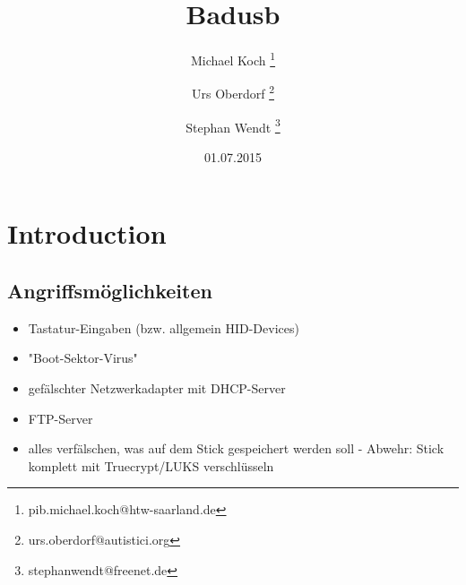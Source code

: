 \documentclass[
a4paper, %
twoside%
]{article}
\title{Badusb}
\author{Michael Koch
\thanks{pib.michael.koch@htw-saarland.de}
\and{Urs Oberdorf}
\thanks{urs.oberdorf@autistici.org}
\and{Stephan Wendt}
\thanks{stephanwendt@freenet.de}}
\date{01.07.2015}
\begin{document}

\maketitle





\section{Introduction}
\subsection{Angriffsmöglichkeiten}
\begin{itemize}
\item Tastatur-Eingaben (bzw. allgemein HID-Devices)
\item "Boot-Sektor-Virus"
\item gefälschter Netzwerkadapter mit DHCP-Server
\item FTP-Server
\item alles verfälschen, was auf dem Stick gespeichert werden soll - Abwehr: Stick komplett mit Truecrypt/LUKS verschlüsseln
\end{itemize}



\end{document}
